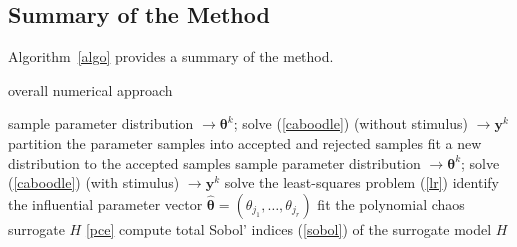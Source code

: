 \subsection{Summary of the Method}
\label{sec:summary}
Algorithm~\ref{algo} provides a summary of the method. 

\begin{algorithm}
\caption{overall numerical approach}\label{algo}
\begin{algorithmic}[1]
 
\State sample parameter distribution  $\longrightarrow \boldsymbol{\theta}^k$; solve (\ref{caboodle}) (without stimulus) $\longrightarrow \mathbf y^k$
\EndFor
\State partition the parameter samples into accepted and rejected samples
\State fit a new distribution to the accepted samples 
\EndWhile
{} 
\State sample parameter distribution  $\longrightarrow \boldsymbol{\theta}^k$; solve (\ref{caboodle}) (with stimulus) $\longrightarrow \mathbf y^k$
\EndFor
{}
\State solve the least-squares problem (\ref{lr}) 
\State identify the influential parameter vector $\hat{\boldsymbol\theta} =   (\theta_{j_1}, \dots, \theta_{j_r})$  
\State fit the polynomial chaos surrogate $H$ \eqref{pce} 
\State compute total Sobol' indices (\ref{sobol}) of the surrogate model $H$ 
\EndFor
\end{algorithmic}
\end{algorithm}




